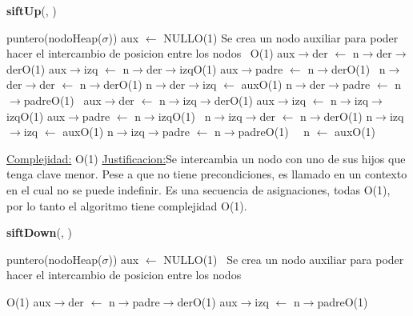 \begin{Representacion}
\begin{Algoritmos}
\begin{algorithm}[H]{\textbf{siftUp}(, )}
\begin{algorithmic}[1]
		\State puntero(nodoHeap($\sigma$)) aux $\leftarrow$ NULL\Comment O(1)
		\Comment Se crea un nodo auxiliar para poder hacer el intercambio de posicion entre los nodos
		\,
		\Comment O(1)
			\State aux$\rightarrow$der $\leftarrow$ n$\rightarrow$der$\rightarrow$der\Comment O(1)
			\State aux$\rightarrow$izq $\leftarrow$ n$\rightarrow$der$\rightarrow$izq\Comment O(1)
			\State aux$\rightarrow$padre $\leftarrow$ n$\rightarrow$der\Comment O(1)
			\,
			\State n$\rightarrow$der$\rightarrow$der $\leftarrow$ n$\rightarrow$der\Comment O(1)
			\State n$\rightarrow$der$\rightarrow$izq $\leftarrow$ aux\Comment O(1)
			\State n$\rightarrow$der$\rightarrow$padre $\leftarrow$ n$\rightarrow$padre\Comment O(1)
			\,
		\Else
			\State aux$\rightarrow$der $\leftarrow$ n$\rightarrow$izq$\rightarrow$der\Comment O(1)
			\State aux$\rightarrow$izq $\leftarrow$ n$\rightarrow$izq$\rightarrow$izq\Comment O(1)
			\State aux$\rightarrow$padre $\leftarrow$ n$\rightarrow$izq\Comment O(1)
			\,
			\State n$\rightarrow$izq$\rightarrow$der $\leftarrow$ n$\rightarrow$der\Comment O(1)
			\State n$\rightarrow$izq$\rightarrow$izq $\leftarrow$ aux\Comment O(1)
			\State n$\rightarrow$izq$\rightarrow$padre $\leftarrow$ n$\rightarrow$padre\Comment O(1)
			\,		
		\EndIf
		\,
		\State n $\leftarrow$ aux\Comment O(1)
		
		\medskip
		\Statex \underline{Complejidad:} O(1)
			\Statex \underline{Justificacion:}Se intercambia un nodo con uno de sus hijos que tenga clave menor. Pese a que no tiene precondiciones, es llamado en un contexto en el cual no se puede indefinir. Es una secuencia de asignaciones, todas O(1), por lo tanto el algoritmo tiene complejidad O(1).
	\end{algorithmic}
\end{algorithm}



\begin{algorithm}[H]{\textbf{siftDown}(, )}
	\begin{algorithmic}[1]
		
		\State puntero(nodoHeap($\sigma$)) aux $\leftarrow$ NULL\Comment O(1) $\,$
		\Comment Se crea un nodo auxiliar para poder hacer el intercambio de posicion entre los nodos
		
		\Comment O(1)
			\State aux$\rightarrow$der $\leftarrow$ n$\rightarrow$padre$\rightarrow$der\Comment O(1)
			\State aux$\rightarrow$izq $\leftarrow$ n$\rightarrow$padre\Comment O(1)
			

\end{algorithmic}
\end{algorithm}
\end{Algoritmos}
\end{Representacion}
